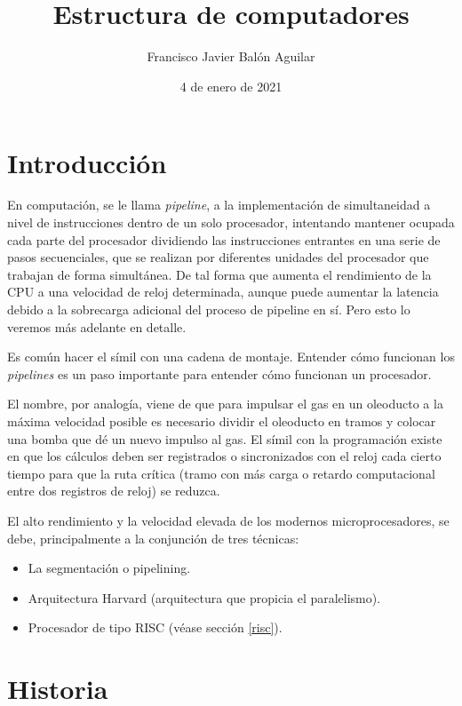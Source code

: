 \documentclass[a4paper, 11pt, titlepage]{article}
\title{\textbf{\nombre}\\ {\normalsize \textbf{Estructura de computadores}}}
\author{Francisco Javier Balón Aguilar}
\date{4 de enero de 2021}
\begin{document}
\maketitle
\renewcommand{\contentsname}{Índice}
\tableofcontents
\newpage

\section{Introducción}

    En computación, se le llama \textit{pipeline}, a la implementación de simultaneidad a nivel de instrucciones 
    dentro de un solo procesador, intentando mantener ocupada cada parte del procesador dividiendo las instrucciones 
    entrantes en una serie de pasos secuenciales, que se realizan por diferentes unidades del procesador que trabajan 
    de forma simultánea. De tal forma que aumenta el rendimiento de la CPU a una velocidad de reloj determinada, 
    aunque puede aumentar la latencia debido a la sobrecarga adicional del proceso de pipeline en sí. Pero esto lo veremos 
    más adelante en detalle.
    
    Es común hacer el símil con una cadena de montaje. Entender cómo funcionan los \textit{pipelines} es un paso 
    importante para entender cómo funcionan un procesador.

    El nombre, por analogía, viene de que para impulsar el gas en un oleoducto a la máxima velocidad posible es necesario 
    dividir el oleoducto en tramos y colocar una bomba que dé un nuevo impulso al gas. El símil con la programación existe 
    en que los cálculos deben ser registrados o sincronizados con el reloj cada cierto tiempo para que la ruta crítica 
    (tramo con más carga o retardo computacional entre dos registros de reloj) se reduzca. 

    El alto rendimiento y la velocidad elevada de los modernos microprocesadores, se debe, principalmente a la conjunción 
    de tres técnicas:

    \begin{itemize}
        \item La segmentación o pipelining.
        \item Arquitectura Harvard (arquitectura que propicia el paralelismo).
        \item Procesador de tipo RISC (véase sección \ref{risc}).
    \end{itemize}

\section{Historia}
\end{document}
